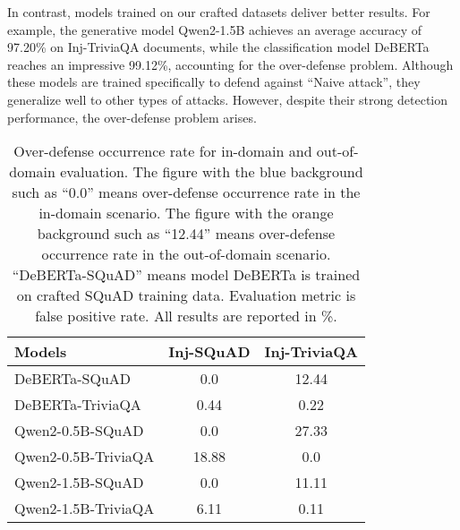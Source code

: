 In contrast, models trained on our crafted datasets deliver better results. For example, the generative model Qwen2-1.5B achieves an average accuracy of 97.20\% on Inj-TriviaQA documents, while the classification model DeBERTa reaches an impressive 99.12\%, accounting for the over-defense problem. Although these models are trained specifically to defend against ``Naive attack'', they generalize well to other types of attacks. However, despite their strong detection performance, the over-defense problem arises.



\begin{table}[!h]
\centering
\small
\renewcommand{\arraystretch}{1.5} %
\begin{tabular}{!{\color{white}\vrule}l!{\color{white}\vrule}c!{\color{white}\vrule}c!{\color{white}\vrule}}
\toprule
{\textbf{Models}} & {\textbf{Inj-SQuAD}} & {\textbf{Inj-TriviaQA}}  \\
 
\midrule

{{DeBERTa-SQuAD}}
     & 0.0 & 12.44    \\



{{DeBERTa-TriviaQA}}
     & 0.44 & 0.22      \\

\midrule

{{Qwen2-0.5B-SQuAD}}
      & 0.0 & 27.33     \\



{{Qwen2-0.5B-TriviaQA}}
   & 18.88 & 0.0  \\


\midrule

{{Qwen2-1.5B-SQuAD}}
      & 0.0 & 11.11     \\



{{Qwen2-1.5B-TriviaQA}}
    & 6.11 & 0.11     \\


\bottomrule
\end{tabular}
\caption{Over-defense occurrence rate for in-domain and out-of-domain evaluation. The figure with the blue background such as ``\colorbox{blue!30}{0.0}'' means over-defense occurrence rate in the in-domain scenario. The figure with the orange background such as ``\colorbox{orange!30}{12.44}'' means over-defense occurrence rate in the out-of-domain scenario. ``DeBERTa-SQuAD'' means model DeBERTa is trained  on crafted SQuAD training data. Evaluation metric is false positive rate. All results are reported in \%.}
\label{tab:over-defense}
\vspace{-10pt}
\end{table}

